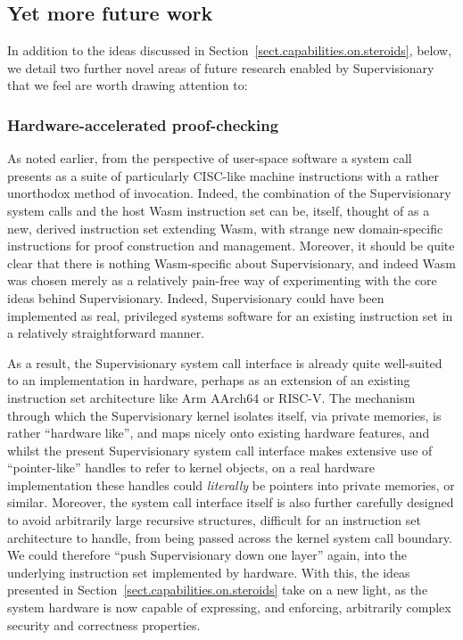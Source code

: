 \documentclass[a4paper, UKenglish, cleveref, autoref, thm-restate, colorlinks]{lipics-v2021}
\begin{document}
\subsection{Yet more future work}
\label{subsect.future.work}

In addition to the ideas discussed in Section~\ref{sect.capabilities.on.steroids}, below, we detail two further novel areas of future research enabled by Supervisionary that we feel are worth drawing attention to:

\subsubsection*{Hardware-accelerated proof-checking}

As noted earlier, from the perspective of user-space software a system call presents as a suite of particularly CISC-like machine instructions with a rather unorthodox method of invocation.
Indeed, the combination of the Supervisionary system calls and the host Wasm instruction set can be, itself, thought of as a new, derived instruction set extending Wasm, with strange new domain-specific instructions for proof construction and management.
Moreover, it should be quite clear that there is nothing Wasm-specific about Supervisionary, and indeed Wasm was chosen merely as a relatively pain-free way of experimenting with the core ideas behind Supervisionary.
Indeed, Supervisionary could have been implemented as real, privileged systems software for an existing instruction set in a relatively straightforward manner.

As a result, the Supervisionary system call interface is already quite well-suited to an implementation in hardware, perhaps as an extension of an existing instruction set architecture like Arm AArch64 or RISC-V.
The mechanism through which the Supervisionary kernel isolates itself, via private memories, is rather ``hardware like'', and maps nicely onto existing hardware features, and whilst the present Supervisionary system call interface makes extensive use of ``pointer-like'' handles to refer to kernel objects, on a real hardware implementation these handles could \emph{literally} be pointers into private memories, or similar.
Moreover, the system call interface itself is also further carefully designed to avoid arbitrarily large recursive structures, difficult for an instruction set architecture to handle, from being passed across the kernel system call boundary.
We could therefore ``push Supervisionary down one layer'' again, into the underlying instruction set implemented by hardware.
With this, the ideas presented in Section~\ref{sect.capabilities.on.steroids} take on a new light, as the system hardware is now capable of expressing, and enforcing, arbitrarily complex security and correctness properties.
\end{document}
